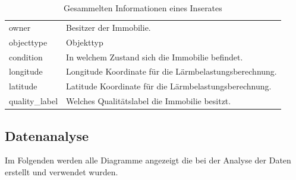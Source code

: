 \begin{table}[ht]
{\begin{tabular}{@{}ll@{}}
  owner  & Besitzer der Immobilie.\\
  objecttype & Objekttyp\\
  condition & In welchem Zustand sich die Immobilie befindet.\\
  longitude & Longitude Koordinate für die Lärmbelastungsberechnung.\\
  latitude & Latitude Koordinate für die Lärmbelastungsberechnung.\\
  quality\_label & Welches Qualitätslabel die Immobilie besitzt.\\
  \bottomrule
\end{tabular}}
\caption{Gesammelten Informationen eines Inserates}
\label{tab:crawled_info}
\end{table}

\subsection{Datenanalyse}
\label{daten_analys}
Im Folgenden werden alle Diagramme angezeigt die bei der Analyse der Daten erstellt und verwendet wurden.

